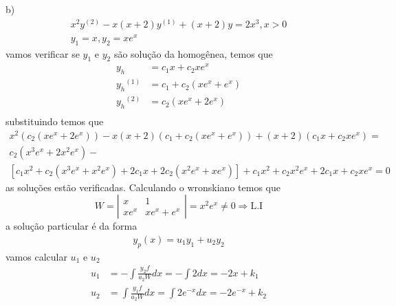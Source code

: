 \documentclass[a4paper,12pt]{article}
\begin{document}
b)
\begin{align*}
	x^{2}y^{(2)} -x(x + 2)y^{(1)} + (x + 2)y = 2x^{3}, x > 0 \\
	y_1 = x, y_2 = xe^{x}
\end{align*}
vamos verificar se $y_1$ e $y_2$ s\~ao solu\c c\~ao da homog\^enea, temos que 
\begin{align*}
	y_h &= c_1x + c_2 xe^{x}\\ 
	{y_h}^{(1)} &= c_1 + c_2(xe^{x} + e^{x}) \\ 
	{y_h}^{(2)} &= c_2(xe^{x} + 2e^{x}) \\ 
\end{align*}
substituindo temos que 
\begin{align*}
	x^{2}(c_2(xe^{x} + 2e^{x})) - x(x + 2)(c_1 + c_2(xe^{x} + e^{x})) + (x + 2) (c_1x + c_2 xe^{x}) = \\
	c_2 (x^{3}e^{x} + 2x^{2}e^{x}) - \\
	[c_1 x^{2} + c_2 (x^{3} e^{x}+ x^{2} e^{x}) + 2 c_1 x + 2c_2 (x^{2} e^{x} + xe^{x})]
	+ c_1 x^{2} + c_2 x^{2} e^{x} + 2c_1x + c_2 xe^{x} = 0
\end{align*}
as solu\c c\~oes est\~ao verificadas. Calculando o wronskiano temos que
\[ W = \left  | 
	\begin{array}{cc}
		x & 1 \\
		xe^{x} & xe^{x} + e^{x}
	\end{array}
	\right |  = x^{2}e^{x} \neq 0 \Rightarrow \mbox{L.I}
\]
a solu\c c\~ao particular \'e da forma 
\begin{align*}
	y_p(x) = u_1 y_1 + u_2 y_2 
\end{align*}
vamos calcular $u_1$ e $u_2$
\begin{align*}
	u_1 &= - \int \frac{y_2 f}{a_2 W} dx = - \int 2dx = -2x + k_1 \\
	u_2 &=  \int \frac{y_1 f}{a_2 W} dx = \int 2e^{-x} dx = -2e^{-x} + k_2 
\end{align*}
\end{document}

